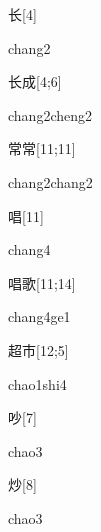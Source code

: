 \begin{verbete}[chang2]{长}[4]
\begin{pronuncia}{chang2}
\end{pronuncia}
\end{verbete}

\begin{verbete}{长成}[4;6]
\begin{pronuncia}{chang2cheng2}
\end{pronuncia}
\end{verbete}

\begin{verbete}{常常}[11;11]
\begin{pronuncia}{chang2chang2}
\end{pronuncia}
\end{verbete}

\begin{verbete}[chang4]{唱}[11]
\begin{pronuncia}{chang4}
\end{pronuncia}
\end{verbete}

\begin{verbete}[chang4ge1]{唱歌}[11;14]
\begin{pronuncia}{chang4ge1}
\end{pronuncia}
\end{verbete}

\begin{verbete}{超市}[12;5]
\begin{pronuncia}{chao1shi4}
\end{pronuncia}
\end{verbete}

\begin{verbete}[chao3]{吵}[7]
\begin{pronuncia}{chao3}
\end{pronuncia}
\end{verbete}

\begin{verbete}[chao3]{炒}[8]
\begin{pronuncia}{chao3}
\end{pronuncia}
\end{verbete}

